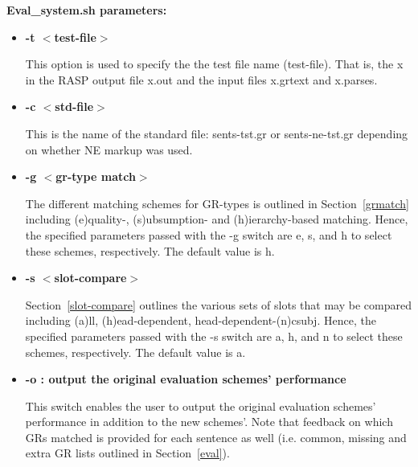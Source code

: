 \documentclass[10pt]{article}
\newcommand{\stt}[1]{{\small\texttt{#1}}}
\begin{document}
{\bf Eval\_system.sh parameters:}
\begin{itemize}
\item {\bf -t $<$test-file$>$}

This option is used to specify the the test file name (test-file). 
That is, the x in the RASP output file x.out and the input files
x.grtext and x.parses.

\item {\bf -c $<$std-file$>$}

This is the name of the standard file: sents-tst.gr or
sents-ne-tst.gr depending on whether NE markup was used.

\item {\bf -g $<$gr-type match$>$}

The different matching schemes for GR-types is outlined in 
Section~\ref{grmatch} including (e)quality-, (s)ubsumption-
and (h)ierarchy-based matching. 
Hence, the specified parameters
passed with the -g switch are e, s, and h to select
these schemes, respectively. 
The default value is h.

\item {\bf -s $<$slot-compare$>$}

Section~\ref{slot-compare} outlines the various sets of
slots that may be compared including (a)ll, (h)ead-dependent, 
head-dependent-(n)csubj.
Hence, the specified parameters
passed with the -s switch are a, h, and n to select
these schemes, respectively. 
The default value is a.



\item {\bf -o : output the original evaluation schemes' performance}

This switch enables the user to output the original evaluation
schemes' performance in addition to the new schemes'. Note
that feedback on which GRs matched is provided for each sentence 
as well (i.e. common, missing and extra GR lists outlined
in Section~\ref{eval}).


\end{itemize}
\end{document}
